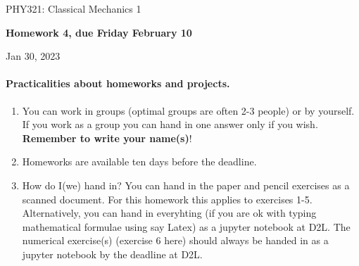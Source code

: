 \documentclass[%
oneside,                 %
final,                   %
10pt]{article}
\begin{document}

\newcommand{\exercisesection}[1]{\subsection*{#1}}






\thispagestyle{empty}

\begin{center}
{\LARGE\bf
\begin{spacing}{1.25}
PHY321: Classical Mechanics 1
\end{spacing}
}
\end{center}


\begin{center}
{\bf Homework 4, due Friday  February 10${}^{}$} \\ [0mm]
\end{center}

\begin{center}
\end{center}
    

\begin{center}
Jan 30, 2023
\end{center}

\vspace{1cm}


\paragraph{Practicalities about  homeworks and projects.}
\begin{enumerate}
\item You can work in groups (optimal groups are often 2-3 people) or by yourself. If you work as a group you can hand in one answer only if you wish. \textbf{Remember to write your name(s)}!

\item Homeworks are available ten days before the deadline.

\item How do I(we)  hand in?  You can hand in the paper and pencil exercises as a scanned document. For this homework this applies to exercises 1-5. Alternatively, you can hand in everyhting (if you are ok with typing mathematical formulae using say Latex) as a jupyter notebook at D2L. The numerical exercise(s) (exercise 6 here) should always be handed in as a jupyter notebook by the deadline at D2L. 
\end{enumerate}
\end{document}
